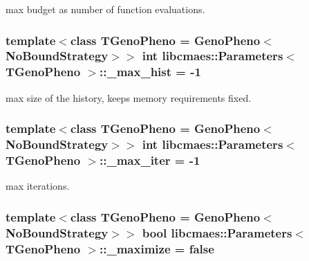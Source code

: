 max budget as number of function evaluations. \hypertarget{classlibcmaes_1_1Parameters_a6ecc091e7e10b30c067f28e5be05faff}{
\subsubsection[{\-\_\-max\-\_\-hist}]{\setlength{\rightskip}{0pt plus 5cm}template$<$class T\-Geno\-Pheno = Geno\-Pheno$<$\-No\-Bound\-Strategy$>$$>$ int {\bf libcmaes\-::\-Parameters}$<$ T\-Geno\-Pheno $>$\-::\-\_\-max\-\_\-hist = -\/1\hspace{0.3cm}{\ttfamily [protected]}}}\label{classlibcmaes_1_1Parameters_a6ecc091e7e10b30c067f28e5be05faff}
max size of the history, keeps memory requirements fixed. \hypertarget{classlibcmaes_1_1Parameters_a60abfc730c5aa46e42ebd1598b59caa6}{
\subsubsection[{\-\_\-max\-\_\-iter}]{\setlength{\rightskip}{0pt plus 5cm}template$<$class T\-Geno\-Pheno = Geno\-Pheno$<$\-No\-Bound\-Strategy$>$$>$ int {\bf libcmaes\-::\-Parameters}$<$ T\-Geno\-Pheno $>$\-::\-\_\-max\-\_\-iter = -\/1\hspace{0.3cm}{\ttfamily [protected]}}}\label{classlibcmaes_1_1Parameters_a60abfc730c5aa46e42ebd1598b59caa6}
max iterations. \hypertarget{classlibcmaes_1_1Parameters_a8c65760fc2d97303d9881c2a945d1d7b}{
\subsubsection[{\-\_\-maximize}]{\setlength{\rightskip}{0pt plus 5cm}template$<$class T\-Geno\-Pheno = Geno\-Pheno$<$\-No\-Bound\-Strategy$>$$>$ bool {\bf libcmaes\-::\-Parameters}$<$ T\-Geno\-Pheno $>$\-::\-\_\-maximize = false\hspace{0.3cm}{\ttfamily [protected]}}}\label{classlibcmaes_1_1Parameters_a8c65760fc2d97303d9881c2a945d1d7b}

